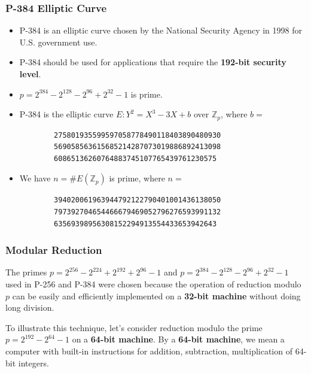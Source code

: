 \documentclass[12pt,titlepage]{article}
\begin{document}
\subsubsection{P-384 Elliptic Curve}
\begin{itemize}
	\item P-384 is an elliptic curve chosen by the National Security Agency in 1998 for U.S. government use.
	\item P-384 should be used for applications that require the \textbf{192-bit security level}.
	\item $p = 2^{384} - 2^{128} - 2^{96} + 2^{32} - 1$ is prime.
	\item P-384 is the elliptic curve $E : Y^2 = X^3 - 3X + b$ over $\mathbb{Z}_p$, where $b = $
	\begin{verbatim}
		275801935599597058778490118403890480930
		569058563615685214287073019886892413098
		60865136260764883745107765439761230575
	\end{verbatim}
	\item We have $n = \#E(\mathbb{Z}_p)$ is prime, where $n = $
	\begin{verbatim}
		394020061963944792122790401001436138050
		797392704654466679469052796276593991132
		63569398956308152294913554433653942643
	\end{verbatim}
\end{itemize}

\subsubsection{Modular Reduction}
The primes $p = 2^{256} - 2^{224} + 2^{192} + 2^{96} - 1$ and $p = 2^{384} - 2^{128} - 2^{96} + 2^{32} - 1$ used in P-256 and P-384 were chosen because the operation of reduction modulo $p$ can be easily and efficiently implemented on a \textbf{32-bit machine} without doing long division. 

To illustrate this technique, let's consider reduction modulo the prime $p = 2^{192} - 2^{64} - 1$ on a \textbf{64-bit machine}. By a \textbf{64-bit machine}, we mean a computer with built-in instructions for addition, subtraction, multiplication of 64-bit integers.
\end{document}
